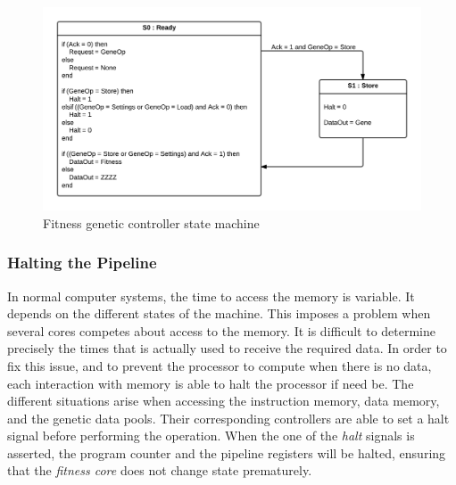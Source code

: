 \begin{figure}[H]
\includegraphics[width=\textwidth]{fpga/fig/fitness_genetic_ctrl.png}
\caption{Fitness genetic controller state machine}
\label{fpga:fitness:fitness_genetic_ctrl}
\end{figure}


\newpage
\subsubsection{Halting the Pipeline}

In normal computer systems, the time to access the memory is variable.
It depends on the different states of the machine.
This imposes a problem when several cores competes about access to the memory.
It is difficult to determine precisely the times that is actually used to receive the required data.
In order to fix this issue, and to prevent the processor to compute when there is no data, each interaction with memory is able to halt the processor if need be.
The different situations arise when accessing the instruction memory, data memory, and the genetic data pools.
Their corresponding controllers are able to set a halt signal before performing the operation.
When the one of the \emph{halt} signals is asserted, the program counter and the pipeline registers will be halted, ensuring that the \emph{fitness core} does not change state prematurely. 
